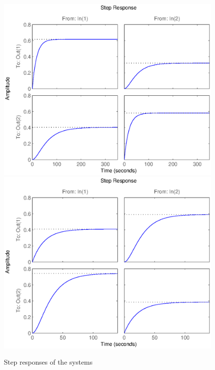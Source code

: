 \begin{figure}[h!t]
    \includegraphics[width=\columnwidth]{fig/step315m}
    \includegraphics[width=\columnwidth]{fig/step315nm}
    \caption{Step responses of the systems}
    \label{step315}
\end{figure}
